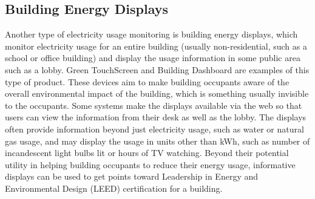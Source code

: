 \subsection{Building Energy Displays}
\label{sec:building-energy-displays}

Another type of electricity usage monitoring is building energy displays, which monitor electricity usage for an entire building (usually non-residential, such as a school or office building) and display the usage information in some public area such as a lobby. Green TouchScreen \cite{greentouchscreen} and Building Dashboard \cite{building-dashboard} are examples of this type of product. These devices aim to make building occupants aware of the overall environmental impact of the building, which is something usually invisible to the occupants. Some systems make the displays available via the web so that users can view the information from their desk as well as the lobby. The displays often provide  information beyond just electricity usage, such as water or natural gas usage, and may display the usage in units other than kWh, such as number of incandescent light bulbs lit or hours of TV watching. Beyond their potential utility in helping building occupants to reduce their energy usage, informative displays can be used to get points toward Leadership in Energy and Environmental Design (LEED) certification for a building.





